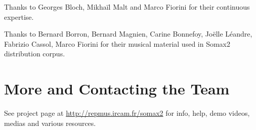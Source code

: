\vspace{5mm}



\vspace{5mm}

\noindent Thanks to Georges Bloch, Mikhaïl Malt and Marco Fiorini for their continuous expertise.

\vspace{5mm}

\noindent Thanks to Bernard Borron, Bernard Magnien, Carine Bonnefoy, Joëlle Léandre, Fabrizio Cassol, Marco Fiorini for their musical material used in Somax2 distribution corpus.

\section{More and Contacting the Team}

See project page at \url{http://repmus.ircam.fr/somax2} for info, help, demo videos, medias and various resources.
